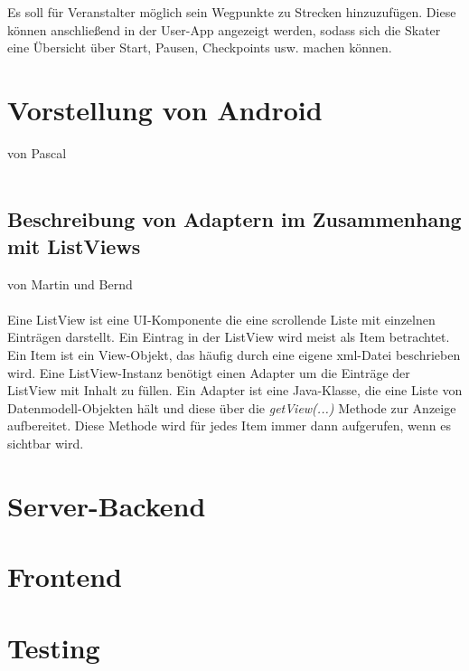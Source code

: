 \documentclass[a4paper, titlepage]{scrartcl}
\newcommand{\AUTHOR}[1]{
	von #1 \\ \\
}
\newcommand{\METHODE}[1]{\emph{#1}}
\begin{document}
Es soll für Veranstalter möglich sein Wegpunkte zu Strecken hinzuzufügen. Diese können anschließend in der User-App angezeigt werden, sodass sich die Skater eine Übersicht über Start, Pausen, Checkpoints usw. machen können.


\section{Vorstellung von Android}
\AUTHOR{Pascal}

\subsection{Beschreibung von Adaptern im Zusammenhang mit ListViews}
\label{sec:adapter}
\AUTHOR{Martin und Bernd}
Eine ListView ist eine UI-Komponente die eine scrollende Liste mit einzelnen Einträgen darstellt. Ein Eintrag in der ListView wird meist als Item betrachtet. Ein Item ist ein View-Objekt, das häufig durch eine eigene xml-Datei beschrieben wird. Eine ListView-Instanz benötigt einen Adapter um die Einträge der ListView mit Inhalt zu füllen. Ein Adapter ist eine Java-Klasse, die eine Liste von Datenmodell-Objekten hält und diese über die \METHODE{getView(...)} Methode zur Anzeige aufbereitet. Diese Methode wird für jedes Item immer dann aufgerufen, wenn es sichtbar wird.

\section{Server-Backend}


\section{Frontend}


\section{Testing}

\end{document}
